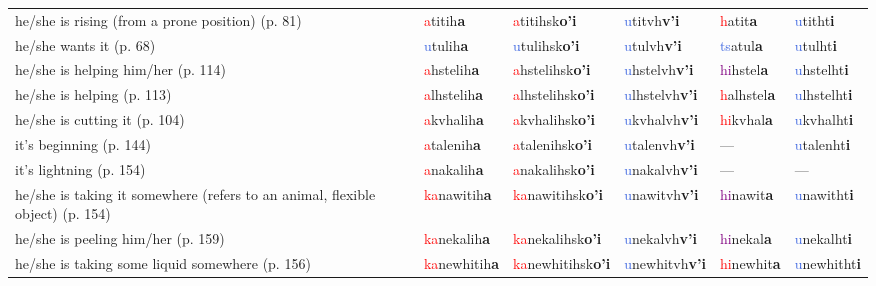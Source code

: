 \documentclass[oneside,openany]{book}%
\begin{document}
\begin{tabularx}{\textwidth}{>{\hsize=1.5\hsize\RaggedRight}X >{\hsize=0.9\hsize}X >{\hsize=0.9\hsize}X >{\hsize=0.9\hsize}X >{\hsize=0.9\hsize}X >{\hsize=0.9\hsize}X}
he/she is rising (from a prone position) (p. 81)&\textcolor{Red}{a}titih\textbf{a}&\textcolor{Red}{a}titihsk\textbf{o'i}&\textcolor{RoyalBlue}{u}titvh\textbf{v'i}&\textcolor{Red}{h}atit\textbf{a}&\textcolor{RoyalBlue}{u}titht\textbf{i}\\%
he/she wants it (p. 68)&\textcolor{RoyalBlue}{u}tulih\textbf{a}&\textcolor{RoyalBlue}{u}tulihsk\textbf{o'i}&\textcolor{RoyalBlue}{u}tulvh\textbf{v'i}&\textcolor{RoyalBlue}{ts}atul\textbf{a}&\textcolor{RoyalBlue}{u}tulht\textbf{i}\\%
he/she is helping him/her (p. 114)&\textcolor{Red}{a}hstelih\textbf{a}&\textcolor{Red}{a}hstelihsk\textbf{o'i}&\textcolor{RoyalBlue}{u}hstelvh\textbf{v'i}&\textcolor{Purple}{hi}hstel\textbf{a}&\textcolor{RoyalBlue}{u}hstelht\textbf{i}\\%
he/she is helping (p. 113)&\textcolor{Red}{a}lhstelih\textbf{a}&\textcolor{Red}{a}lhstelihsk\textbf{o'i}&\textcolor{RoyalBlue}{u}lhstelvh\textbf{v'i}&\textcolor{Red}{h}alhstel\textbf{a}&\textcolor{RoyalBlue}{u}lhstelht\textbf{i}\\%
he/she is cutting it (p. 104)&\textcolor{Red}{a}kvhalih\textbf{a}&\textcolor{Red}{a}kvhalihsk\textbf{o'i}&\textcolor{RoyalBlue}{u}kvhalvh\textbf{v'i}&\textcolor{Red}{hi}kvhal\textbf{a}&\textcolor{RoyalBlue}{u}kvhalht\textbf{i}\\%
it's beginning (p. 144)&\textcolor{Red}{a}talenih\textbf{a}&\textcolor{Red}{a}talenihsk\textbf{o'i}&\textcolor{RoyalBlue}{u}talenvh\textbf{v'i}&---&\textcolor{RoyalBlue}{u}talenht\textbf{i}\\%
it's lightning (p. 154)&\textcolor{Red}{a}nakalih\textbf{a}&\textcolor{Red}{a}nakalihsk\textbf{o'i}&\textcolor{RoyalBlue}{u}nakalvh\textbf{v'i}&---&---\\%
he/she is taking it somewhere (refers to an animal, flexible object) (p. 154)&\textcolor{Red}{ka}nawitih\textbf{a}&\textcolor{Red}{ka}nawitihsk\textbf{o'i}&\textcolor{RoyalBlue}{u}nawitvh\textbf{v'i}&\textcolor{Purple}{hi}nawit\textbf{a}&\textcolor{RoyalBlue}{u}nawitht\textbf{i}\\%
he/she is peeling him/her (p. 159)&\textcolor{Red}{ka}nekalih\textbf{a}&\textcolor{Red}{ka}nekalihsk\textbf{o'i}&\textcolor{RoyalBlue}{u}nekalvh\textbf{v'i}&\textcolor{Purple}{hi}nekal\textbf{a}&\textcolor{RoyalBlue}{u}nekalht\textbf{i}\\%
he/she is taking some liquid somewhere (p. 156)&\textcolor{Red}{ka}newhitih\textbf{a}&\textcolor{Red}{ka}newhitihsk\textbf{o'i}&\textcolor{RoyalBlue}{u}newhitvh\textbf{v'i}&\textcolor{Red}{hi}newhit\textbf{a}&\textcolor{RoyalBlue}{u}newhitht\textbf{i}\\%

\end{tabularx}
\end{document}
